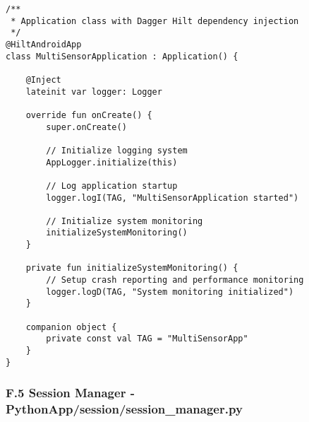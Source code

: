 \documentclass[12pt,a4paper]{article}
\begin{document}
\begin{verbatim}
/**
 * Application class with Dagger Hilt dependency injection
 */
@HiltAndroidApp
class MultiSensorApplication : Application() {
    
    @Inject
    lateinit var logger: Logger
    
    override fun onCreate() {
        super.onCreate()
        
        // Initialize logging system
        AppLogger.initialize(this)
        
        // Log application startup
        logger.logI(TAG, "MultiSensorApplication started")
        
        // Initialize system monitoring
        initializeSystemMonitoring()
    }
    
    private fun initializeSystemMonitoring() {
        // Setup crash reporting and performance monitoring
        logger.logD(TAG, "System monitoring initialized")
    }
    
    companion object {
        private const val TAG = "MultiSensorApp"
    }
}
\end{verbatim}

\subsubsection{F.5 Session Manager - PythonApp/session/session_manager.py}
\end{document}
